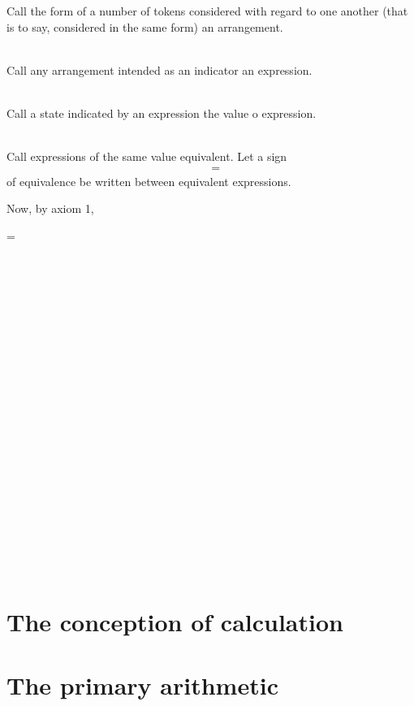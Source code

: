 \documentclass[a4paper]{article}
\theoremstyle{remark}
\begin{document}
Call  the  form  of  a  number  of  tokens  considered  with  regard  to  one  another  (that  is  to  say,  considered   in  the  same   form)   an  arrangement. 
\\\\

Call  any  arrangement  intended  as an  indicator  an  expression.
\\\\

Call   a   state   indicated   by  an  expression  the  value   o   expression. 
\\\\

Call  expressions  of  the same  value  equivalent.  Let  a  sign
\begin{align*}
    &=    
\end{align*} of equivalence be written between equivalent expressions.

Now, by axiom 1, 
\begin{form}
     = 
\end{form}
\\\\
\\\\
\\\\
\\\\
\\\\
\\\\
\\\\
\\\\
\\\\
\\\\

\section{The conception of calculation}
\section{The primary arithmetic}
\end{document}
